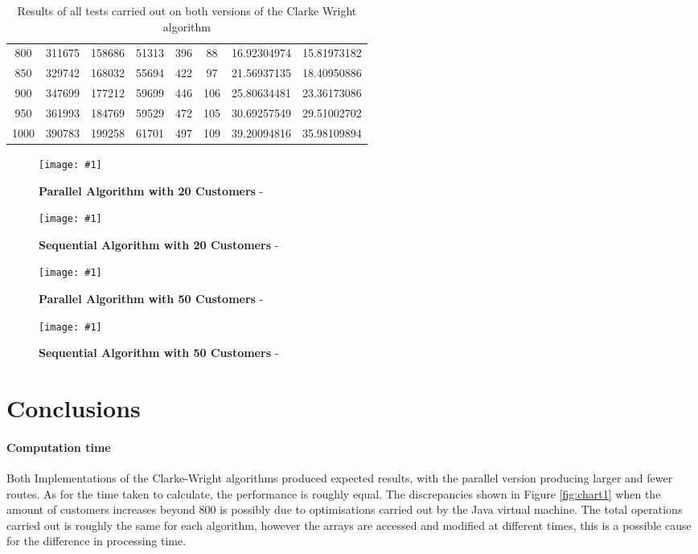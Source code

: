 \documentclass[conference]{acmsiggraph}
\newcommand{\figuremacroW}[4]{
	\begin{figure}[h] %
		\centering
		\texttt{[image: \#1]}
		\caption[#2]{\textbf{#2} - #3}
		\label{fig:#1}
	\end{figure}
}
\begin{document}
\begin{table}[b]
{{\begin{minipage}{\textwidth}
\begin{tabular}{cccccccc}
    800                  & 311675             & 158686          & 51313         & 396               & 88              & 16.92304974               & 15.81973182             \\
    850                  & 329742             & 168032          & 55694         & 422               & 97              & 21.56937135               & 18.40950886             \\
    900                  & 347699             & 177212          & 59699         & 446               & 106             & 25.80634481               & 23.36173086             \\
    950                  & 361993             & 184769          & 59529         & 472               & 105             & 30.69257549               & 29.51002702             \\
    1000                 & 390783             & 199258          & 61701         & 497               & 109             & 39.20094816               & 35.98109894             \\\hline
    \end{tabular}
   
    \caption[Table caption text]{Results of all tests carried out on both versions of the Clarke Wright algorithm}
    \label{table:name}
    \end{minipage} }
}
\end{table}

\clearpage

\figuremacroW
{rand00020cwpsn}
{Parallel Algorithm with 20 Customers}
{}
{0.76}

\figuremacroW
{rand00020cwsn}
{Sequential Algorithm with 20 Customers}
{}
{0.76}

\figuremacroW
{rand00050cwpsn}
{Parallel Algorithm with 50 Customers}
{}
{0.755}

\figuremacroW
{rand00050cwsn}
{Sequential Algorithm with 50 Customers}
{}
{0.75}


\section{Conclusions}
\paragraph{Computation time}
Both Implementations of the Clarke-Wright algorithms produced expected results, with the parallel version producing larger and fewer routes. As for the time taken to calculate, the performance is roughly equal.
The discrepancies shown in Figure \ref{fig:chart1} when the amount of customers increases beyond 800 is possibly due to optimisations carried out by the Java virtual machine. The total operations carried out is roughly the same for each algorithm, however the arrays are accessed and modified at different times, this is a possible cause for the difference in processing time.
\end{document}
